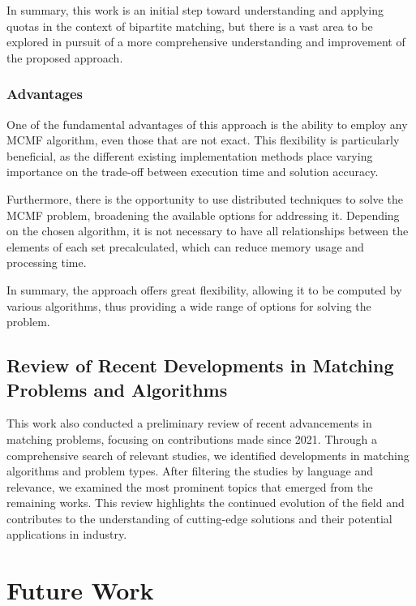         In summary, this work is an initial step toward understanding and applying quotas in the context of bipartite matching, but there is a vast area to be explored in pursuit of a more comprehensive understanding and improvement of the proposed approach.
        
        \subsubsection{Advantages}
        
        One of the fundamental advantages of this approach is the ability to employ any MCMF algorithm, even those that are not exact. This flexibility is particularly beneficial, as the different existing implementation methods place varying importance on the trade-off between execution time and solution accuracy.
        
        Furthermore, there is the opportunity to use distributed techniques to solve the MCMF problem, broadening the available options for addressing it.
        Depending on the chosen algorithm, it is not necessary to have all relationships between the elements of each set precalculated, which can reduce memory usage and processing time.
        
        In summary, the approach offers great flexibility, allowing it to be computed by various algorithms, thus providing a wide range of options for solving the problem.

\subsection{Review of Recent Developments in Matching Problems and Algorithms}

    This work also conducted a preliminary review of recent advancements in matching problems, focusing on contributions made since 2021. Through a comprehensive search of relevant studies, we identified developments in matching algorithms and problem types. After filtering the studies by language and relevance, we examined the most prominent topics that emerged from the remaining works. This review highlights the continued evolution of the field and contributes to the understanding of cutting-edge solutions and their potential applications in industry.


\section{Future Work}

